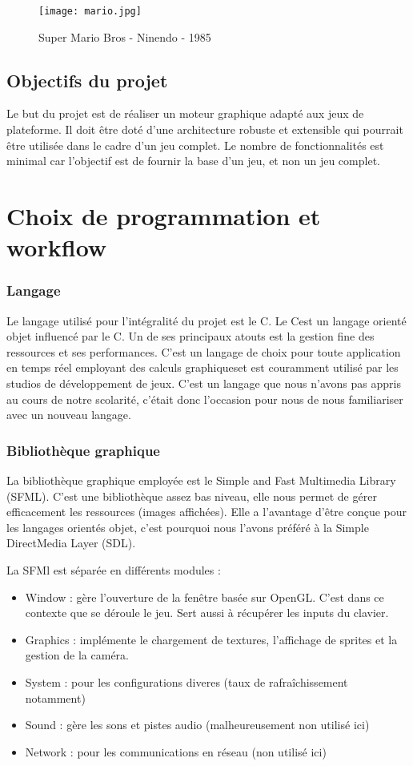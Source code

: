 \documentclass[a4paper,11pt]{article}
\newcommand{\CC}{C\nolinebreak\hspace{-.05em}\raisebox{.4ex}{\tiny\bf +}\nolinebreak\hspace{-.10em}\raisebox{.4ex}{\tiny\bf +}}
\begin{document}
\vspace{0.6cm}
\begin{figure}[h]
\begin{center}
\texttt{[image: mario.jpg]}
\caption{Super Mario Bros - Ninendo - 1985}
\end{center}
\end{figure}

\subsection{Objectifs du projet}
Le but du projet est de réaliser un moteur graphique adapté aux jeux de plateforme. Il doit être doté d'une architecture robuste et extensible qui pourrait être utilisée dans le cadre d'un jeu complet. Le nombre de fonctionnalités est minimal car l'objectif est de fournir la base d'un jeu, et non un jeu complet.
    
\section{Choix de programmation et workflow}
\subsubsection*{Langage}
Le langage utilisé pour l'intégralité du projet est le \CC .
Le \CC est un langage orienté objet influencé par le C. Un de ses principaux atouts est la gestion fine des ressources et ses performances. C'est un langage de choix pour toute application en temps réel employant des calculs graphiqueset est couramment utilisé par les studios de développement de jeux.
C'est un langage que nous n'avons pas appris au cours de notre scolarité, c'était donc l'occasion pour nous de nous familiariser avec un nouveau langage.

\subsubsection*{Bibliothèque graphique}
La bibliothèque graphique employée est le Simple and Fast Multimedia Library (SFML). C'est une bibliothèque assez bas niveau, elle nous permet de gérer efficacement les ressources (images affichées). Elle a l'avantage d'être conçue pour les langages orientés objet, c'est pourquoi nous l'avons préféré à la Simple DirectMedia Layer (SDL).

La SFMl est séparée en différents modules :
\begin{itemize}
\item Window : gère l'ouverture de la fenêtre basée sur OpenGL. C'est dans ce contexte que se déroule le jeu. Sert aussi à récupérer les inputs du clavier.
\item Graphics : implémente le chargement de textures, l'affichage de sprites et la gestion de la caméra.
\item System : pour les configurations diveres (taux de rafraîchissement notamment)
\item Sound : gère les sons et pistes audio (malheureusement non utilisé ici)
\item Network : pour les communications en réseau (non utilisé ici)
\end{itemize}
\end{document}
